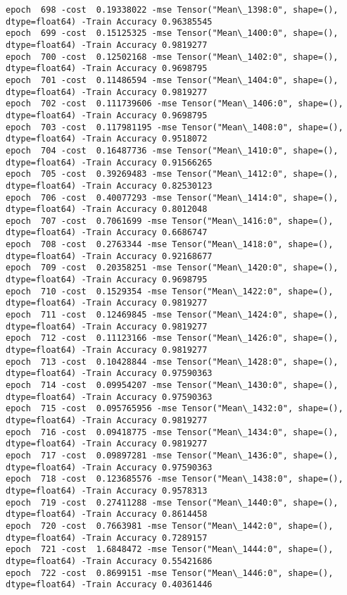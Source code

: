 \documentclass[11pt]{article}
\begin{document}
\begin{Verbatim}[commandchars=\\\{\}]
epoch  698 -cost  0.19338022 -mse Tensor("Mean\_1398:0", shape=(), dtype=float64) -Train Accuracy 0.96385545
epoch  699 -cost  0.15125325 -mse Tensor("Mean\_1400:0", shape=(), dtype=float64) -Train Accuracy 0.9819277
epoch  700 -cost  0.12502168 -mse Tensor("Mean\_1402:0", shape=(), dtype=float64) -Train Accuracy 0.9698795
epoch  701 -cost  0.11486594 -mse Tensor("Mean\_1404:0", shape=(), dtype=float64) -Train Accuracy 0.9819277
epoch  702 -cost  0.111739606 -mse Tensor("Mean\_1406:0", shape=(), dtype=float64) -Train Accuracy 0.9698795
epoch  703 -cost  0.117981195 -mse Tensor("Mean\_1408:0", shape=(), dtype=float64) -Train Accuracy 0.9518072
epoch  704 -cost  0.16487736 -mse Tensor("Mean\_1410:0", shape=(), dtype=float64) -Train Accuracy 0.91566265
epoch  705 -cost  0.39269483 -mse Tensor("Mean\_1412:0", shape=(), dtype=float64) -Train Accuracy 0.82530123
epoch  706 -cost  0.40077293 -mse Tensor("Mean\_1414:0", shape=(), dtype=float64) -Train Accuracy 0.8012048
epoch  707 -cost  0.7061699 -mse Tensor("Mean\_1416:0", shape=(), dtype=float64) -Train Accuracy 0.6686747
epoch  708 -cost  0.2763344 -mse Tensor("Mean\_1418:0", shape=(), dtype=float64) -Train Accuracy 0.92168677
epoch  709 -cost  0.20358251 -mse Tensor("Mean\_1420:0", shape=(), dtype=float64) -Train Accuracy 0.9698795
epoch  710 -cost  0.1529354 -mse Tensor("Mean\_1422:0", shape=(), dtype=float64) -Train Accuracy 0.9819277
epoch  711 -cost  0.12469845 -mse Tensor("Mean\_1424:0", shape=(), dtype=float64) -Train Accuracy 0.9819277
epoch  712 -cost  0.11123166 -mse Tensor("Mean\_1426:0", shape=(), dtype=float64) -Train Accuracy 0.9819277
epoch  713 -cost  0.10428844 -mse Tensor("Mean\_1428:0", shape=(), dtype=float64) -Train Accuracy 0.97590363
epoch  714 -cost  0.09954207 -mse Tensor("Mean\_1430:0", shape=(), dtype=float64) -Train Accuracy 0.97590363
epoch  715 -cost  0.095765956 -mse Tensor("Mean\_1432:0", shape=(), dtype=float64) -Train Accuracy 0.9819277
epoch  716 -cost  0.09418775 -mse Tensor("Mean\_1434:0", shape=(), dtype=float64) -Train Accuracy 0.9819277
epoch  717 -cost  0.09897281 -mse Tensor("Mean\_1436:0", shape=(), dtype=float64) -Train Accuracy 0.97590363
epoch  718 -cost  0.123685576 -mse Tensor("Mean\_1438:0", shape=(), dtype=float64) -Train Accuracy 0.9578313
epoch  719 -cost  0.27411288 -mse Tensor("Mean\_1440:0", shape=(), dtype=float64) -Train Accuracy 0.8614458
epoch  720 -cost  0.7663981 -mse Tensor("Mean\_1442:0", shape=(), dtype=float64) -Train Accuracy 0.7289157
epoch  721 -cost  1.6848472 -mse Tensor("Mean\_1444:0", shape=(), dtype=float64) -Train Accuracy 0.55421686
epoch  722 -cost  0.8699151 -mse Tensor("Mean\_1446:0", shape=(), dtype=float64) -Train Accuracy 0.40361446

\end{Verbatim}
\end{document}
